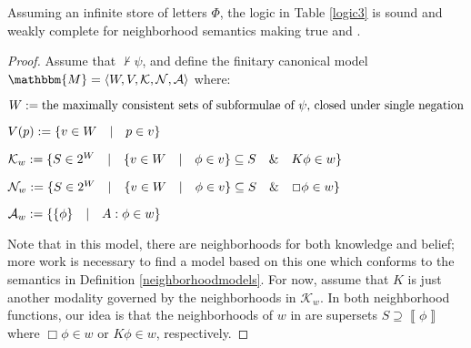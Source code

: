 \begin{theorem}
  Assuming an infinite store of letters $\Phi$, the logic in Table
  \ref{logic3} is sound and weakly complete for neighborhood semantics making
  true  and .
\end{theorem}

\begin{proof}
  Assume that $\nvdash \psi$, and define the finitary canonical model
  $\mathbbm{M}= \langle W, V, \mathcal{K}, \mathcal{N}, \mathcal{A} \rangle$
  where:
  \begin{itemizedot}
    \item $W := \text{the maximally consistent sets of subformulae of
    $\psi$, closed under single negation}$
    
    \item $V (p) := \{v \in W \hspace{1em} | \hspace{1em} p \in v\}$
    
    \item $\mathcal{K}_w := \{S \in 2^W \hspace{1em} | \hspace{1em} \{v
    \in W \hspace{1em} | \hspace{1em} \phi \in v\} \subseteq S \hspace{1em} \&
    \hspace{1em} K \phi \in w\}$
    
    \item $\mathcal{N}_w := \{S \in 2^W \hspace{1em} | \hspace{1em} \{v
    \in W \hspace{1em} | \hspace{1em} \phi \in v\} \subseteq S \hspace{1em} \&
    \hspace{1em} \Box \phi \in w\}$
    
    \item $\mathcal{A}_w := \{\{\phi\} \hspace{1em} | \hspace{1em} A :
    \phi \in w\}$
  \end{itemizedot}
  Note that in this model, there are neighborhoods for both knowledge and
  belief; more work is necessary to find a model based on this one which
  conforms to the semantics in Definition \ref{neighborhoodmodels}.  For now,
  assume that $K$ is just another modality governed by the neighborhoods in
  $\mathcal{K}_w$.  In both neighborhood functions, our idea is that the
  neighborhoods of $w$ in are supersets $S \supseteq \left\llbracket \phi
  \right\rrbracket$ where $\Box \phi \in w$ or $K \phi \in w$, respectively.
  

\end{proof}
